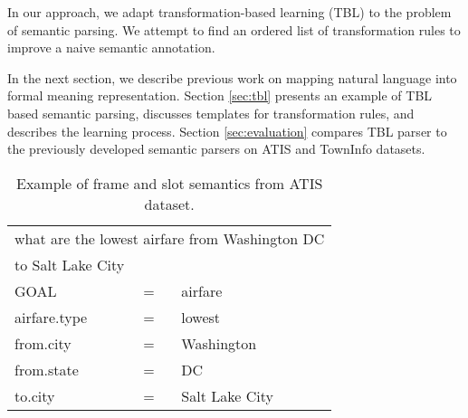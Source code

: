 \documentclass{article}
\begin{document}

In our approach, we adapt transformation-based learning (TBL) \cite{brill95} to the problem of semantic parsing. We attempt to find an ordered list of transformation rules to improve a naive semantic annotation. 


In the next section, we describe previous work on mapping natural language into formal meaning representation. Section \ref{sec:tbl} presents an example of TBL based semantic parsing, discusses templates for transformation rules, and describes the learning process. Section \ref{sec:evaluation} compares TBL parser to the previously developed semantic parsers on ATIS \cite{atis94} and TownInfo \cite{mairesse09} datasets.

\begin{table}
\begin{center}
\begin{tabular}{lll} 
  \multicolumn{3}{l}{what are the lowest airfare from Washington DC} \\
  \multicolumn{3}{l}{to Salt Lake City} \\
  \hline
  GOAL          & = & airfare \\
  airfare.type  & = & lowest \\
  from.city     & = & Washington \\
  from.state    & = & DC \\
  to.city       & = & Salt Lake City \\
\end{tabular} 
\end{center}
\vspace{-0.5cm}
\caption{Example of frame and slot semantics from ATIS \cite{atis94} dataset.}
\label{tbl:sem:example}
\end{table}
\end{document}
